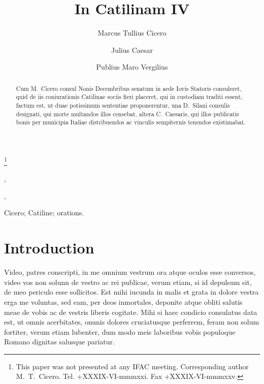 \documentclass[twocolumn]{autart}    %
\begin{document}
\begin{frontmatter}

\title{In Catilinam IV} %

\thanks[footnoteinfo]{This paper was not presented at any IFAC 
meeting. Corresponding author M.~T.~Cicero. Tel. +XXXIX-VI-mmmxxi. 
Fax +XXXIX-VI-mmmxxv.}

\author[Paestum]{Marcus Tullius Cicero},    %
\author[Rome]{Julius Caesar},               %
\author[Baiae]{Publius Maro Vergilius}  %

\address[Paestum]{Buckingham Palace, Paestum}  %
\address[Rome]{Senate House, Rome}             %
\address[Baiae]{The White House, Baiae}        %

          
\begin{keyword}                           %
Cicero; Catiline; orations.               %
\end{keyword}                             %


\begin{abstract}                          %
Cum M.~Cicero consul Nonis Decembribus senatum in aede Iovis 
Statoris consuleret, quid de iis coniurationis Catilinae sociis 
fieri placeret, qui in custodiam traditi essent, factum est, ut 
duae potissimum sententiae proponerentur, una D.~Silani consulis 
designati, qui morte multandos illos censebat, altera C.~Caesaris, 
qui illos publicatis bonis per municipia Italiae distribuendos 
ac vinculis sempiternis tenendos existimabat.
\end{abstract}

\end{frontmatter}

\section{Introduction}
Video, patres conscripti, in me omnium vestrum ora atque oculos esse 
conversos, video vos non solunn de vestro ac rei publicae, verum 
etiam, si id depulsum sit, de meo periculo esse sollicitos. Est mihi 
iucunda in malis et grata in dolore vestra erga me voluntas, sed eam, 
per deos inmortales, deponite atque obliti salutis meae de vobis ac 
de vestris liberis cogitate. Mihi si haec condicio consulatus data 
est, ut omnis acerbitates, onunis dolores cruciatusque perferrem, 
feram non solum fortiter, verum etiam lubenter, dum modo meis 
laboribus vobis populoque Romano dignitas salusque pariatur.
\end{document}
